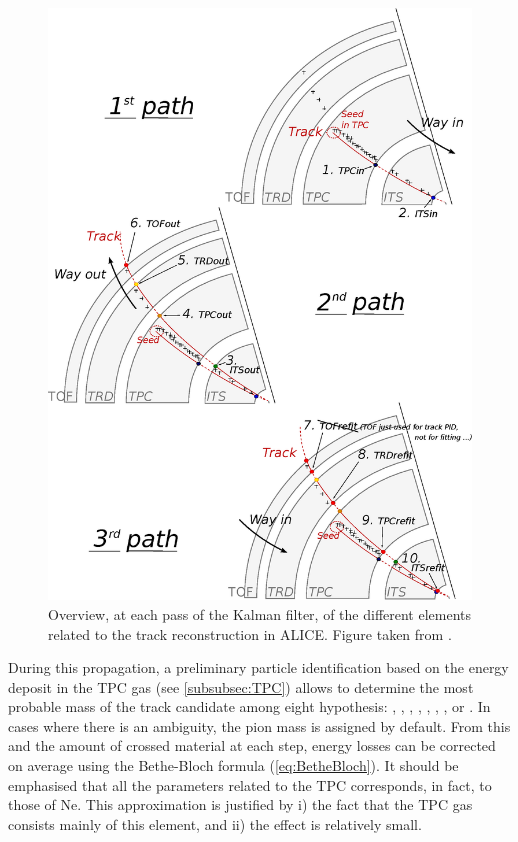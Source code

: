 \begin{figure}[!t]
	\centering
	\includegraphics[width=1.05\textwidth]{Figs/Chapter3/Schema-PcpTrackingALICE.eps}
	\caption{Overview, at each pass of the Kalman filter, of the different elements related to the track reconstruction in ALICE. Figure taken from \cite{maireTrackReconstructionPrinciple2011}.}
	\label{fig:Kalmanfiltering}
\end{figure}

During this propagation, a preliminary particle identification based on the energy deposit in the TPC gas (see \Sec\ref{subsubsec:TPC}) allows to determine the most probable mass of the track candidate among eight hypothesis: \ePlusMinus, \muPlusMinus, \rmPiPlusMinus, \Kplusmin, \pOrPbar, \rmDeutonPM, \rmTritonPM, \rmHeThreePM or \rmHeFourPM. In cases where there is an ambiguity, the pion mass is assigned by default. From this and the amount of crossed material at each step, energy losses can be corrected on average using the Bethe-Bloch formula (\eq\ref{eq:BetheBloch}). It should be emphasised that all the parameters related to the TPC corresponds, in fact, to those of Ne. This approximation is justified by i) the fact that the TPC gas consists mainly of this element, and ii) the effect is relatively small. 

